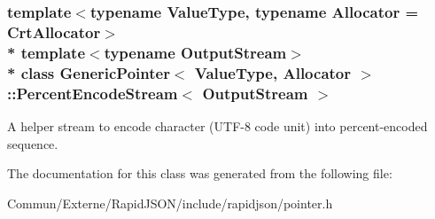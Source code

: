 \subsubsection*{template$<$typename Value\+Type, typename Allocator = Crt\+Allocator$>$\\*
template$<$typename Output\+Stream$>$\\*
class Generic\+Pointer$<$ Value\+Type, Allocator $>$\+::\+Percent\+Encode\+Stream$<$ Output\+Stream $>$}

A helper stream to encode character (U\+T\+F-\/8 code unit) into percent-\/encoded sequence. 

The documentation for this class was generated from the following file\+:\begin{DoxyCompactItemize}
\item 
Commun/\+Externe/\+Rapid\+J\+S\+O\+N/include/rapidjson/pointer.\+h\end{DoxyCompactItemize}
